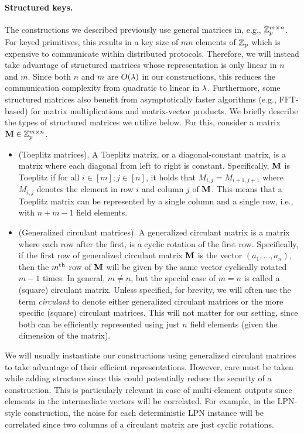 \paragraph{Structured keys.}
The constructions we described previously use general matrices in, e.g., $\mathbb{Z}_p^{m \times n}$. For keyed primitives, this results in a key size of $mn$ elements of $\mathbb{Z}_p$ which is expensive to communicate within distributed protocols. Therefore, we will instead take advantage of structured matrices whose representation is only linear in $n$ and $m$. Since both $n$ and $m$ are $O(\lambda)$ in our constructions, this reduces the communication complexity from quadratic to linear in $\lambda$. Furthermore, some structured matrices also benefit from asymptotically faster algorithms (e.g., FFT-based) for matrix multiplications and matrix-vector products. We briefly describe the types of structured matrices we utilize below. For this, consider a matrix $\mat{M} \in \Z_p^{m \times n}$.

\begin{itemize}
    \item (Toeplitz matrices).
    A Toeplitz matrix, or a diagonal-constant matrix, is a matrix where each diagonal from left to right is constant. Specifically, $\mat{M}$ is Toeplitz if for all $i \in [m]; j \in [n]$, it holds that $M_{i,j} = M_{i+1, j+1}$ where $M_{i,j}$ denotes the element in row $i$ and column $j$ of $\mat{M}$. This means that a Toeplitz matrix can be represented by a single column and a single row, i.e., with $n + m - 1$ field elements.

    \item (Generalized circulant matrices). 
    A generalized circulant matrix is a matrix where each row after the first, is a cyclic rotation of the first row. Specifically, if the first row of generalized circulant matrix $\mat{M}$ is the vector $(a_1, \dots, a_n)$, then the $m^{\textnormal{th}}$ row of $\mat{M}$ will be given by the same vector cyclically rotated $m-1$ times. In general, $m \neq n$, but the special case of $m = n$ is called a (square) circulant matrix. Unless specified, for brevity, we will often use the term \textit{circulant} to denote either generalized circulant matrices or the more specific (square) circulant matrices. This will not matter for our setting, since both can be efficiently represented using just $n$ field elements (given the dimension of the matrix).
\end{itemize}

\iffull
We will usually instantiate our constructions using generalized circulant matrices to take advantage of their efficient representations. However, care must be taken while adding structure since this could potentially reduce the security of a construction. This is particularly relevant in case of multi-element outputs since elements in the intermediate vectors will be correlated. For example, in the LPN-style construction, the noise for each deterministic LPN instance will be correlated since two columns of a circulant matrix are just cyclic rotations. 

